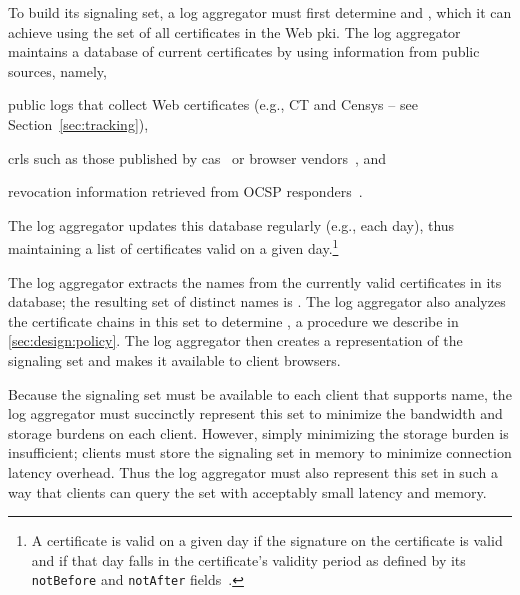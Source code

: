 To build its signaling set, a log aggregator must first determine \httpsset
and \multicertset, which it can achieve using the set of all certificates in the
Web \ac{pki}. The log aggregator maintains a database of current certificates by
using information from public sources, namely,
\begin{inparaenum}
\item public logs that collect Web certificates 
  (e.g., CT and Censys -- see Section~\ref{sec:tracking}),
\item \acp{crl} such as those published by \acp{ca}~\cite{rfc5280} or browser
  vendors~\cite{langley2012revocation, goodwin2015revoking}, and
\item revocation information retrieved from OCSP responders~\cite{rfc6960}.
\end{inparaenum}
The log aggregator updates this database regularly (e.g., each day), thus
maintaining a list of certificates valid on a given day.\footnote{A certificate
  is valid on a given day if the signature on the certificate is valid and if
  that day falls in the certificate's validity period as defined by its
\texttt{notBefore} and \texttt{notAfter} fields~\cite{rfc5280}.}

The log aggregator extracts the names from the currently valid
certificates in its database;
the resulting set of distinct names is \httpsset. 
The log aggregator also analyzes the certificate chains
in this set to determine \multicertset, a procedure we describe in
\autoref{sec:design:policy}. The log aggregator then creates a representation of
the signaling set and makes it available to client browsers.

Because the signaling set must be available to each client that supports \ac{name},
the log aggregator must succinctly represent this set to minimize the bandwidth and storage burdens on
each client. However, simply minimizing the storage burden is insufficient;
clients must store the signaling set in memory to minimize connection latency
overhead. Thus the log aggregator must also represent this set in such a way
that clients can query the set with acceptably small latency and memory.

